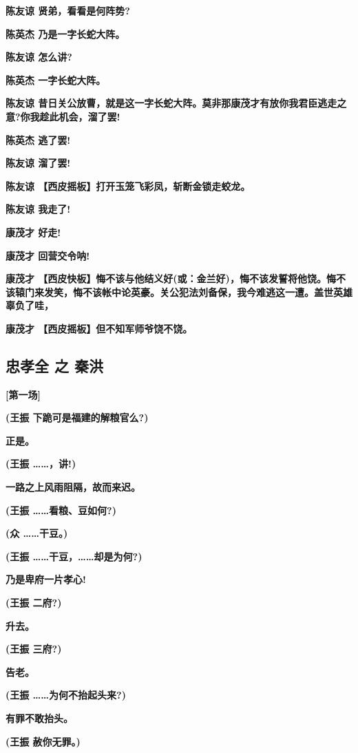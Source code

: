 \textbf{陈友谅 贤弟，看看是何阵势?}

\textbf{陈英杰 乃是一字长蛇大阵。}

\textbf{陈友谅 怎么讲?}

\textbf{陈英杰 一字长蛇大阵。}

\textbf{陈友谅
昔日关公放曹，就是这一字长蛇大阵。莫非那康茂才有放你我君臣逃走之意?你我趁此机会，溜了罢!}

\textbf{陈英杰 逃了罢!}

\textbf{陈友谅 溜了罢!}

\textbf{陈友谅 【西皮摇板】打开玉笼飞彩凤，斩断金锁走蛟龙。}

\textbf{陈友谅 我走了!}

\textbf{康茂才 好走!}

\textbf{康茂才 回营交令呐!}

\textbf{康茂才
【西皮快板】悔不该与他结义好(或：金兰好)，悔不该发誓将他饶。悔不该辕门来发笑，悔不该帐中论英豪。关公犯法刘备保，我今难逃这一遭。盖世英雄辜负了哇，}

\textbf{康茂才 【西皮摇板】但不知军师爷饶不饶。}

\newpage
\hypertarget{ux5fe0ux5b5dux5168-ux4e4b-ux79e6ux6d2a}{%
\subsection{忠孝全 之
秦洪}\label{ux5fe0ux5b5dux5168-ux4e4b-ux79e6ux6d2a}}

\textbf{{[}第一场{]}}

\textbf{(王振 下跪可是福建的解粮官么?)}

\textbf{正是。}

\textbf{(王振 \ldots{}\ldots{}，讲!)}

\textbf{一路之上风雨阻隔，故而来迟。}

\textbf{(王振 \ldots{}\ldots{}看粮、豆如何?)}

\textbf{(众 \ldots{}\ldots{}干豆。)}

\textbf{(王振 \ldots{}\ldots{}干豆，\ldots{}\ldots{}却是为何?)}

\textbf{乃是卑府一片孝心!}

\textbf{(王振 二府?)}

\textbf{升去。}

\textbf{(王振 三府?)}

\textbf{告老。}

\textbf{(王振 \ldots{}\ldots{}为何不抬起头来?)}

\textbf{有罪不敢抬头。}

\textbf{(王振 赦你无罪。)}

